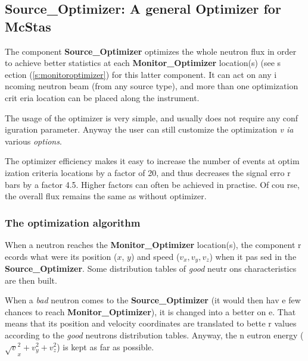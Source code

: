\documentclass[12pt]{report}
\begin{document}
\subsection{Source\_Optimizer: A general Optimizer for McStas}
\label{s:sourceoptimizer}

The component {\bf Source\_Optimizer} optimizes the whole neutron flux in order 
to achieve better statistics at each {\bf Monitor\_Optimizer} location(s) (see s
ection (\ref{s:monitoroptimizer}) for this latter component. It can act on any i
ncoming neutron beam (from any source type), and more than one optimization crit
eria location can be placed along the instrument. 

The usage of the optimizer is very simple, and usually does not require any conf
iguration parameter. Anyway the user can still customize the optimization {\it v
ia} various {\it options}.

The optimizer efficiency makes it easy to increase the number of events at optim
ization criteria locations by a factor of 20, and thus decreases the signal erro
r bars by a factor 4.5. Higher factors can often be achieved in practise. Of cou
rse, the overall flux remains the same as without optimizer.

\subsubsection{The optimization algorithm}

When a neutron reaches the {\bf Monitor\_Optimizer} location(s), the component r
ecords what were its position ($x$, $y$) and speed ($v_x, v_y, v_z$) when it pas
sed in the {\bf Source\_Optimizer}. Some distribution tables of {\it good} neutr
ons characteristics are then built. 

When a {\it bad} neutron comes to the {\bf Source\_Optimizer} (it would then hav
e few chances to reach {\bf Monitor\_Optimizer}), it is changed into a better on
e. That means that its position and velocity coordinates are translated to bette
r values according to the {\it good} neutrons distribution tables. Anyway, the n
eutron energy ($\surd v_x^2 + v_y^2 + v_z^2$) is kept as far as possible. 
\end{document}
